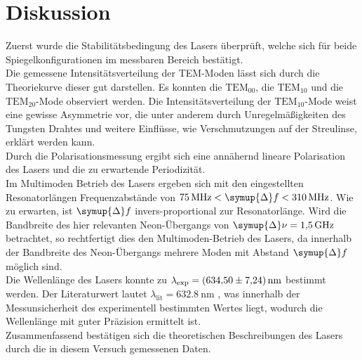 \section{Diskussion}
\label{sec:Diskussion}
Zuerst wurde die Stabilitätsbedingung des Lasers überprüft, welche sich für beide Spiegelkonfigurationen im messbaren Bereich bestätigt. \\
Die gemessene Intensitätsverteilung der TEM-Moden lässt sich durch die Theoriekurve dieser gut darstellen. Es konnten die $\text{TEM}_{00}$,
die $\text{TEM}_{10}$ und die $\text{TEM}_{20}$-Mode observiert werden. Die Intensitätsverteilung der $\text{TEM}_{10}$-Mode weist eine gewisse Asymmetrie vor,
die unter anderem durch Unregelmäßigkeiten des Tungsten Drahtes und weitere Einflüsse, wie Verschmutzungen auf der Streulinse, erklärt werden kann. \\
Durch die Polarisationsmessung ergibt sich eine annähernd lineare Polarisation des Lasers und die zu erwartende Periodizität. \\
Im Multimoden Betrieb des Lasers ergeben sich mit den eingestellten Resonatorlängen Frequenzabstände von $\qty{75}{\mega\hertz} < \symup{\Delta}f < \qty{310}{\mega\hertz}$.
Wie zu erwarten, ist $\symup{\Delta}f$ invers-proportional zur Resonatorlänge. Wird die Bandbreite des hier relevanten Neon-Übergangs von 
$\symup{\Delta}\nu = \qty{1.5}{\giga\hertz}$ \cite{HeNe_Wiki} betrachtet, so rechtfertigt dies den Multimoden-Betrieb des Lasers, da innerhalb der Bandbreite des Neon-Übergangs 
mehrere Moden mit Abstand $\symup{\Delta}f$ möglich sind. \\
Die Wellenlänge des Lasers konnte zu $\lambda_\text{exp} = \qty{634.5 +- 7.24}{\nano\metre}$ bestimmt werden. Der Literaturwert lautet 
$\lambda_\text{lit} =  \qty{632.8}{\nano\metre}$ \cite{HeNe_Wiki}, was innerhalb der Messunsicherheit des experimentell bestimmten Wertes liegt, wodurch 
die Wellenlänge mit guter Präzision ermittelt ist. \\
Zusammenfassend bestätigen sich die theoretischen Beschreibungen des Lasers durch die in diesem Versuch gemessenen Daten.
